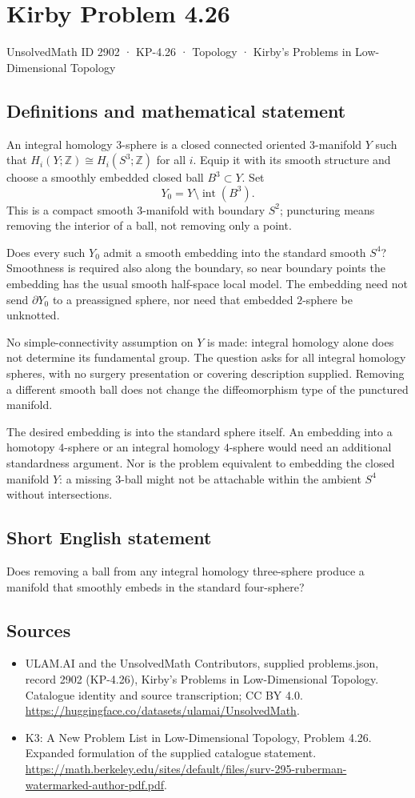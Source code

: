 \documentclass[11pt,a4paper]{article}
\begin{document}
\section*{Kirby Problem 4.26}\label{2902}
{\small UnsolvedMath ID 2902 · KP-4.26 · Topology · Kirby's Problems in Low-Dimensional Topology}
\subsection{Definitions and mathematical statement}
An integral homology $3$-sphere is a closed connected oriented
$3$-manifold $Y$ such that $H_i(Y;\mathbb Z)\cong H_i(S^3;\mathbb Z)$
for all $i$. Equip it with its smooth structure and choose a smoothly
embedded closed ball $B^3\subset Y$. Set
\[
 Y_0=Y\setminus\operatorname{int}(B^3).
\]
This is a compact smooth $3$-manifold with boundary $S^2$; puncturing
means removing the interior of a ball, not removing only a point.

Does every such $Y_0$ admit a smooth embedding into the standard
smooth $S^4$? Smoothness is required also along the boundary, so near
boundary points the embedding has the usual smooth half-space local
model. The embedding need not send $\partial Y_0$ to a preassigned
sphere, nor need that embedded $2$-sphere be unknotted.

No simple-connectivity assumption on $Y$ is made: integral homology
alone does not determine its fundamental group. The question asks
for all integral homology spheres, with no surgery presentation or
covering description supplied. Removing a different smooth ball does
not change the diffeomorphism type of the punctured manifold.

The desired embedding is into the standard sphere itself. An embedding
into a homotopy $4$-sphere or an integral homology $4$-sphere would
need an additional standardness argument. Nor is the problem equivalent
to embedding the closed manifold $Y$: a missing $3$-ball might not
be attachable within the ambient $S^4$ without intersections.
\subsection{Short English statement}
Does removing a ball from any integral homology three-sphere produce a manifold that smoothly embeds in the standard four-sphere?
\subsection{Sources}
\begin{itemize}
\item[S1] ULAM.AI and the UnsolvedMath Contributors, supplied problems.json, record 2902 (KP-4.26), Kirby's Problems in Low-Dimensional Topology. Catalogue identity and source transcription; CC BY 4.0.
\url{https://huggingface.co/datasets/ulamai/UnsolvedMath}.
\item[S2] K3: A New Problem List in Low-Dimensional Topology, Problem 4.26. Expanded formulation of the supplied catalogue statement.
\url{https://math.berkeley.edu/sites/default/files/surv-295-ruberman-watermarked-author-pdf.pdf}.
\end{itemize}
\end{document}
